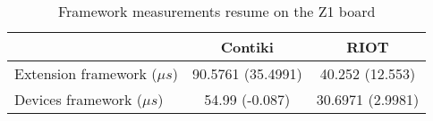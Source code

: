\begin{table}[!ht]
  \centering
  \begin{tabular}{l|c|c}
                      & Contiki           & RIOT             \\ \hline
  Extension framework ($\mu s$) & 90.5761 (35.4991) & 40.252 (12.553)       \\
  Devices framework ($\mu s$)   & 54.99 (-0.087)  & 30.6971 (2.9981)
  \end{tabular}
  \caption{Framework measurements resume on the Z1 board}
  \label{tab:framework-measurements-resume-z1}
  \end{table}